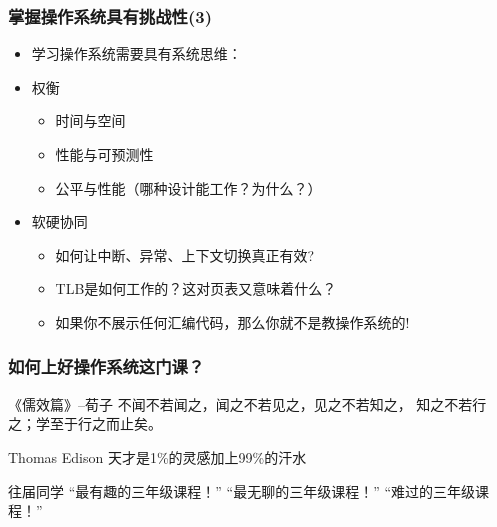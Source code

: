     
\begin{frame}
    \frametitle{掌握操作系统具有挑战性(3)}
    \begin{itemize}
        \item 学习操作系统需要具有系统思维：
        \item 权衡
            \begin{itemize}
                \item 时间与空间
                \item 性能与可预测性
                \item 公平与性能（哪种设计能工作？为什么？）
            \end{itemize}
        \item 软硬协同
            \begin{itemize}
                \item 如何让中断、异常、上下文切换真正有效? 
                \item TLB是如何工作的？这对页表又意味着什么？
                \item 如果你不展示任何汇编代码，那么你就不是教操作系统的!
            \end{itemize}
    \end{itemize}
\end{frame}

    
\begin{frame}
    \frametitle{如何上好操作系统这门课？}
\begin{block}{《儒效篇》--荀子}
不闻不若闻之，闻之不若见之，见之不若知之，
知之不若行之；学至于行之而止矣。 
\end{block}      
\begin{block}{Thomas Edison }
   天才是1\%的灵感加上99\%的汗水 
\end{block}    
\begin{block}{往届同学}
   “最有趣的三年级课程！”  “最无聊的三年级课程！” “难过的三年级课程！”
\end{block}    

\end{frame}



